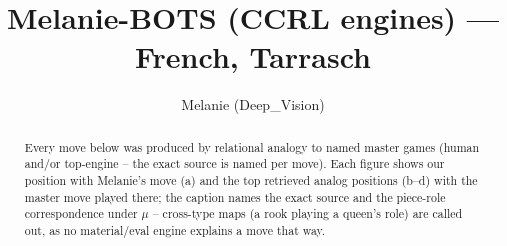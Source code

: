 \documentclass[11pt]{article}
\title{Melanie-BOTS (CCRL engines) — French, Tarrasch}
\author{Melanie (Deep\_Vision)}
\date{}
\begin{document}
\maketitle

\begin{abstract}Every move below was produced by relational analogy to named master games (human and/or top-engine -- the exact source is named per move). Each figure shows our position with Melanie's move (a) and the top retrieved analog positions (b--d) with the master move played there; the caption names the exact source and the piece-role correspondence under $\mu$ -- cross-type maps (a rook playing a queen's role) are called out, as no material/eval engine explains a move that way.\end{abstract}

\begin{figure}[p]\centering
\begin{subfigure}{0.46\textwidth}\centering
\resizebox{\linewidth}{!}{%
\newchessgame
\chessboard[
  setfen={r1bqkb2/pp1n1ppr/2n1p3/2ppP3/3P4/2P5/PP1N1PPP/R1BQK1NR w KQq - 0 8},
  showmover=false,
  pgfstyle=straightmove, color=movearrow, markmove={f2-f3}
]}
\caption{}
\end{subfigure}\hfill
\begin{subfigure}{0.46\textwidth}\centering
\resizebox{\linewidth}{!}{%
\newchessgame
\chessboard[
  setfen={r1bqk2r/pp1n1pRp/2p1p3/3p4/2PP4/2N1P3/PPQ2P1b/R1B1KB2 b Qkq - 0 10},
  showmover=false,
  pgfstyle=straightmove, color=movearrow, markmove={d7-f8}
]}
\caption{}
\end{subfigure}
\\[4pt]
\begin{subfigure}{0.46\textwidth}\centering
\resizebox{\linewidth}{!}{%
\newchessgame
\chessboard[
  setfen={r1bqk2r/pp1n1pRp/2p1p3/3p4/2PP4/2N1P3/PPQ2P1b/R1B1KB2 b Qkq - 0 10},
  showmover=false,
  pgfstyle=straightmove, color=movearrow, markmove={d7-f8}
]}
\caption{}
\end{subfigure}\hfill
\begin{subfigure}{0.46\textwidth}\centering
\resizebox{\linewidth}{!}{%
\newchessgame
\chessboard[
  setfen={r1bqk2r/pp1n1pRp/2p1p3/3p4/2PP4/2N1P3/PPQ2P1b/R1B1KB2 b Qkq - 0 10},
  showmover=false,
  pgfstyle=straightmove, color=movearrow, markmove={d7-f8}
]}
\caption{}
\end{subfigure}

\end{figure}
\end{document}
